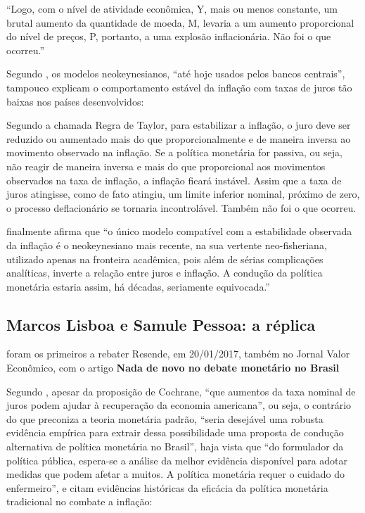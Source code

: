 \documentclass[
	10pt,				%
	openright,			%
	twoside,			%
	a5paper,			%
	english,			%
	french,				%
	spanish,			%
	brazil				%
	]{abntex2}
\renewenvironment{quote}
  {\small\list{}{\rightmargin=0.1cm \leftmargin=4cm}%
   \item\relax}
  {\endlist}
\begin{document}
``Logo, com o nível de atividade econômica, Y, mais ou menos constante,
um brutal aumento da quantidade de moeda, M, levaria a um aumento
proporcional do nível de preços, P, portanto, a uma explosão
inflacionária. Não foi o que ocorreu.''

Segundo , os modelos neokeynesianos, ``até
hoje usados pelos bancos centrais'', tampouco explicam o comportamento
estável da inflação com taxas de juros tão baixas nos países
desenvolvidos:

\begin{quote}
Segundo a chamada Regra de Taylor, para estabilizar a inflação, o juro
deve ser reduzido ou aumentado mais do que proporcionalmente e de
maneira inversa ao movimento observado na inflação. Se a política
monetária for passiva, ou seja, não reagir de maneira inversa e mais do
que proporcional aos movimentos observados na taxa de inflação, a
inflação ficará instável. Assim que a taxa de juros atingisse, como de
fato atingiu, um limite inferior nominal, próximo de zero, o processo
deflacionário se tornaria incontrolável. Também não foi o que ocorreu.
\end{quote}

 finalmente afirma que ``o único modelo
compatível com a estabilidade observada da inflação é o neokeynesiano
mais recente, na sua vertente neo-fisheriana, utilizado apenas na
fronteira acadêmica, pois além de sérias complicações analíticas,
inverte a relação entre juros e inflação. A condução da política
monetária estaria assim, há décadas, seriamente equivocada.''

\subsection{Marcos Lisboa e Samule Pessoa: a
réplica}\label{marcos-lisboa-e-samule-pessoa-a-ruxe9plica}

 foram os primeiros a rebater Resende, em
20/01/2017, também no Jornal Valor Econômico, com o artigo \textbf{Nada
de novo no debate monetário no Brasil} \cite{lisboapessoa}

Segundo , apesar da proposição de
Cochrane, ``que aumentos da taxa nominal de juros podem ajudar à
recuperação da economia americana'', ou seja, o contrário do que
preconiza a teoria monetária padrão, ``seria desejável uma robusta
evidência empírica para extrair dessa possibilidade uma proposta de
condução alternativa de política monetária no Brasil'', haja vista que
``do formulador da política pública, espera-se a análise da melhor
evidência disponível para adotar medidas que podem afetar a muitos. A
política monetária requer o cuidado do enfermeiro'', e citam evidências
históricas da eficácia da política monetária tradicional no combate a
inflação:
\end{document}
